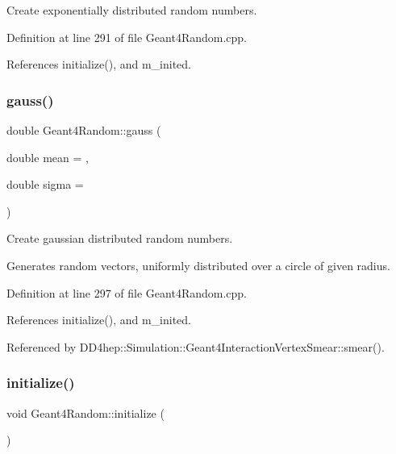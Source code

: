 Create exponentially distributed random numbers. 



Definition at line 291 of file Geant4\+Random.\+cpp.



References initialize(), and m\+\_\+inited.

\hypertarget{class_d_d4hep_1_1_simulation_1_1_geant4_random_a759d26cbc394bdbd9d34196c33b7419e}{}\label{class_d_d4hep_1_1_simulation_1_1_geant4_random_a759d26cbc394bdbd9d34196c33b7419e} 
\subsubsection{\texorpdfstring{gauss()}{gauss()}}
{\footnotesize\ttfamily double Geant4\+Random\+::gauss (\begin{DoxyParamCaption}\item[{double}]{mean = {},  }\item[{double}]{sigma = {} }\end{DoxyParamCaption})}



Create gaussian distributed random numbers. 

Generates random vectors, uniformly distributed over a circle of given radius. 

Definition at line 297 of file Geant4\+Random.\+cpp.



References initialize(), and m\+\_\+inited.



Referenced by D\+D4hep\+::\+Simulation\+::\+Geant4\+Interaction\+Vertex\+Smear\+::smear().

\hypertarget{class_d_d4hep_1_1_simulation_1_1_geant4_random_a31f43f8b61c1eacccac4d89945e97f6b}{}\label{class_d_d4hep_1_1_simulation_1_1_geant4_random_a31f43f8b61c1eacccac4d89945e97f6b} 
\subsubsection{\texorpdfstring{initialize()}{initialize()}}
{\footnotesize\ttfamily void Geant4\+Random\+::initialize (\begin{DoxyParamCaption}{ }\end{DoxyParamCaption})}



